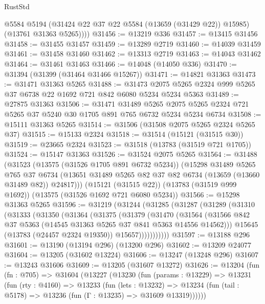 \begin{lexlean}{RustStd}
\begin{coremodule}
          @5584
          @5194
          (@31424 @22 @37 @22 @5584 (@13659 (@31429 @22)) @15985)
          (@13761 @31363 @5265))))
@31456 := @13219 @336
@31457 := @13415 @31456
@31458 := @31455 @31457
@31459 := @13289 @2719
@31460 := @14039 @31459
@31461 := @31458 @31460
@31462 := @13313 @2719
@31463 := @14043 @31462
@31464 := @31461 @31463
@31466 := @14048 (@14050 @336)
@31470 := @31394 (@31399 (@31464 @31466 @15267))
@31471 := @14821 @31363
@31473 := @31471 @31363 @5265
@31488 := @31473 @2075 @5265 @2324 @999 @5265 @37 @6738 @22 @1692 @721 @842 @6080 @5234 @5234 @5363
@31489 := @27875 @31363
@31506 := @31471
    @31489
    @5265
    @2075
    @5265
    @2324
    @721
    @5265
    @37
    @5240
    @30
    @1705
    @891
    @765
    @6732
    @5234
    @5234
    @6734
@31508 := @15111 @31363 @5265
@31514 := @31506 (@31508 @2075 @5265 @2324 @5265 @37)
@31515 := @15133 @2324
@31518 := @31514 (@15121 (@31515 @30))
@31519 := @23665 @2324
@31523 := @31518 (@13783 (@31519 @721 @1705))
@31524 := @15147 @31363
@31526 := @31524 @2075 @5265
@31564 := @31488
    (@31523
      (@13575 (@31526 @1705 @891 @6732 @5234))
      (@15298
        @31489
        @5265
        @765
        @37
        @6734
        (@13651 @31489 @5265 @82 @37 @82 @6734 (@13659 (@13660 @31489 @82)) @24817)))
    (@15121 (@31515 @22))
    (@13783 (@31519 @999 @1692))
    (@13575 (@31526 @1692 @721 @6080 @5234))
@31566 := @15298 @31363 @5265
@31596 := @31219
    (@31244
      (@31285
        (@31287
          (@31289
            (@31310
              (@31333
                (@31350
                  (@31364
                    (@31375
                      (@31379
                        (@31470
                          (@31564
                            (@31566
                              @842
                              @37
                              @5363
                              (@14545 @31363 @5265 @37 @841 @5363 @14556 @14562)))
                          @15645
                          (@13783 (@24457 @2324 @19350))
                          @15657)))))))))))
@31597 := @13188 @296
@31601 := @13190 (@13194 @296) (@13200 @296)
@31602 := @13209 @24077
@31604 := @13205 (@31602 @13224)
@31606 := @13247 (@13248 @296)
@31607 := @13243 @31606
@31609 := @13205 (@31607 @13272)
@31626 := @13204
    (fun (fn : @705) =>
    @31604
      (@13227
        (@13230
          (fun (params : @13229) =>
          @13231
            (fun (rty : @4160) =>
            @13233
              (fun (lets : @13232) =>
              @13234 (fun (tail : @5178) => @13236 (fun (Γ : @13235) => @31609 @13319))))))

\end{coremodule}
\end{lexlean}
